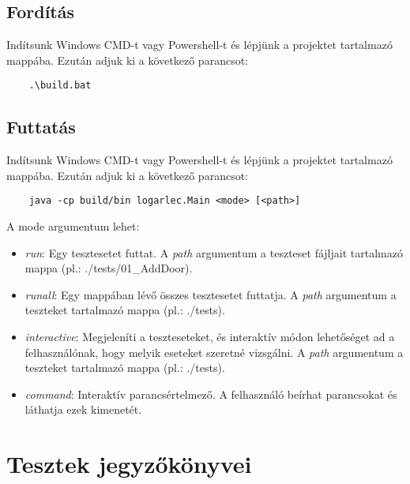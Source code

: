 \clearpage
\subsection{Fordítás}

Indítsunk Windows CMD-t vagy Powershell-t és lépjünk a projektet tartalmazó mappába. Ezután adjuk ki a következő parancsot:
\begin{verbatim}
    .\build.bat
\end{verbatim}

\subsection{Futtatás}

Indítsunk Windows CMD-t vagy Powershell-t és lépjünk a projektet tartalmazó mappába. Ezután adjuk ki a következő parancsot:
\begin{verbatim}
    java -cp build/bin logarlec.Main <mode> [<path>]
\end{verbatim}
A mode argumentum lehet: 
\begin{itemize}
    \item \textit{run}: Egy tesztesetet futtat. A \textit{path} argumentum a teszteset fájljait tartalmazó mappa (pl.: ./tests/01\_AddDoor).
    \item \textit{runall}: Egy mappában lévő összes tesztesetet futtatja. A \textit{path} argumentum a teszteket tartalmazó mappa (pl.: ./tests).
    \item \textit{interactive}: Megjeleníti a teszteseteket, és interaktív módon lehetőséget ad a felhasználónak, hogy melyik eseteket szeretné vizsgálni. A \textit{path} argumentum a teszteket tartalmazó mappa (pl.: ./tests).
    \item \textit{command}: Interaktív parancsértelmező. A felhasználó beírhat parancsokat és láthatja ezek kimenetét.
\end{itemize}

\section{Tesztek jegyzőkönyvei}

